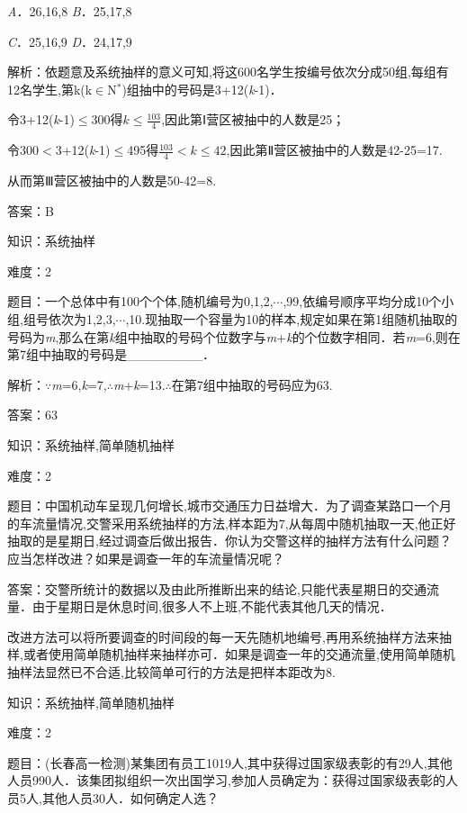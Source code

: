 \documentclass{article} %
\begin{document}
\textit{A}．26,16,8  \textit{B}．25,17,8

\textit{C}．25,16,9  \textit{D}．24,17,9

解析：依题意及系统抽样的意义可知,将这600名学生按编号依次分成50组,每组有12名学生,第k(k$\mathrm{\in}$N${}^{*}$)组抽中的号码是3+12(\textit{k}-1)．

令3+12(\textit{k}-1)$\mathrm{\le}$300得$k\le \frac{103}{4}$,因此第Ⅰ营区被抽中的人数是25；

令300$\mathrm{<}$3+12(\textit{k}-1)$\mathrm{\le}$495得$\frac{103}{4}<k\le42$,因此第Ⅱ营区被抽中的人数是42-25=17.

从而第Ⅲ营区被抽中的人数是50-42=8.

答案：B

知识：系统抽样

难度：2

题目：一个总体中有100个个体,随机编号为0,1,2,$\cdots$,99,依编号顺序平均分成10个小组,组号依次为1,2,3,$\cdots$,10.现抽取一个容量为10的样本,规定如果在第1组随机抽取的号码为\textit{m},那么在第\textit{k}组中抽取的号码个位数字与\textit{m}+\textit{k}的个位数字相同．若\textit{m}=6,则在第7组中抽取的号码是\_\_\_\_\_\_\_\_．

解析：$\mathrm{\because}$\textit{m}=6,\textit{k}=7,$\mathrm{\therefore}$\textit{m}+\textit{k}=13.$\mathrm{\therefore}$在第7组中抽取的号码应为63.

答案：63

知识：系统抽样,简单随机抽样

难度：2

题目：中国机动车呈现几何增长,城市交通压力日益增大．为了调查某路口一个月的车流量情况,交警采用系统抽样的方法,样本距为7,从每周中随机抽取一天,他正好抽取的是星期日,经过调查后做出报告．你认为交警这样的抽样方法有什么问题？应当怎样改进？如果是调查一年的车流量情况呢？

答案：交警所统计的数据以及由此所推断出来的结论,只能代表星期日的交通流量．由于星期日是休息时间,很多人不上班,不能代表其他几天的情况．

改进方法可以将所要调查的时间段的每一天先随机地编号,再用系统抽样方法来抽样,或者使用简单随机抽样来抽样亦可．如果是调查一年的交通流量,使用简单随机抽样法显然已不合适,比较简单可行的方法是把样本距改为8.

知识：系统抽样,简单随机抽样

难度：2

题目：(长春高一检测)某集团有员工1019人,其中获得过国家级表彰的有29人,其他人员990人．该集团拟组织一次出国学习,参加人员确定为：获得过国家级表彰的人员5人,其他人员30人．如何确定人选？
\end{document}
